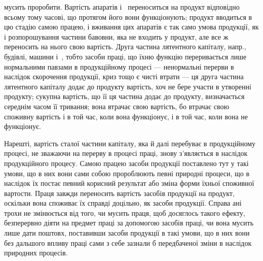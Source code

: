 \parcont{}  %
мусить проробити. Вартість апаратів і~ переноситься на продукт
відповідно всьому тому часові, що протягом його вони функціонують;
продукт вводиться в цю стадію самою працею, і вживання цих апаратів
є так само умова продукції, як і розпорошування частини
бавовни, яка не входить у продукт, але все ж переносить на нього
свою вартість. Друга частина лятентного капіталу, напр., будівлі, машини
і~, тобто засоби праці, що їхню функцію переривається лише
нормальними павзами в продукційному процесі — ненормальні
перерви в наслідок скорочення продукції, криз тощо є чисті
втрати — ця друга частина лятентного капіталу додає до продукту
вартість, хоч не бере участи в утворенні продукту; сукупна вартість, що
її ця частина додає до продукту, визначається середнім часом її тривання;
вона втрачає свою вартість, бо втрачає свою споживну вартість і в той
час, коли вона функціонує, і в той час, коли вона не функціонує.

Нарешті, вартість сталої частини капіталу, яка й далі перебуває в
продукційному процесі, не зважаючи на перерву в процесі праці, знову
з’являється в наслідок продукційного процесу. Самою працею засоби
продукції поставлено тут у такі умови, що в них вони сами собою пророблюють
певні природні процеси, що в наслідок їх постає певний
корисний результат або зміна форми їхньої споживної вартости. Праця
завжди переносить вартість засобів продукції на продукт, оскільки вона
споживає їх справді доцільно, як засоби продукції. Справа ані трохи не
змінюється від того, чи мусить праця, щоб досяглось такого ефекту,
безперервно діяти на предмет праці за допомогою засобів праці, чи вона
мусить лише дати поштовх, поставивши засоби продукції в такі умови,
що в них вони без дальшого впливу праці сами з себе зазнали б
передбаченої зміни в наслідок природних процесів.

